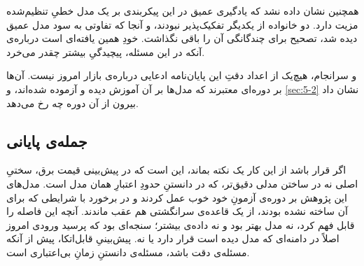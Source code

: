 همچنین نشان داده نشد که یادگیری عمیق در این پیکربندی بر یک مدل خطیِ تنظیم‌شده
مزیت دارد. دو خانواده از یکدیگر تفکیک‌پذیر نبودند، و آنجا که تفاوتی به سود مدل
عمیق دیده شد، تصحیح برای چندگانگی آن را باقی نگذاشت. خودِ همین یافته‌ای است
درباره‌ی آنکه در این مسئله، پیچیدگیِ بیشتر چقدر می‌خرد.

و سرانجام، هیچ‌یک از اعداد دقتِ این پایان‌نامه ادعایی درباره‌ی بازار امروز
نیست. آن‌ها بر دوره‌ای معتبرند که مدل‌ها بر آن آموزش دیده و آزموده شده‌اند، و
\cref{sec:5-2} نشان داد بیرون از آن دوره چه رخ می‌دهد.

\enlargethispage{2\baselineskip}

\subsection*{جمله‌ی پایانی}

{
اگر قرار باشد از این کار یک نکته بماند، این است که در پیش‌بینی قیمت برق،
سختیِ اصلی نه در ساختن مدلی دقیق‌تر، که در دانستنِ حدودِ اعتبارِ همان مدل است.
مدل‌های این پژوهش بر دوره‌ی آزمونِ خود خوب عمل کردند و در برخورد با شرایطی که
برای آن ساخته نشده بودند، از یک قاعده‌ی سرانگشتی هم عقب ماندند. آنچه این فاصله
را قابل فهم کرد، نه مدل بهتر بود و نه داده‌ی بیشتر؛ سنجه‌ای بود که پرسید ورودی
امروز اصلاً در دامنه‌ای که مدل دیده است قرار دارد یا نه. پیش‌بینیِ قابل‌اتکا،
پیش از آنکه مسئله‌ی دقت باشد، مسئله‌ی دانستنِ زمانِ بی‌اعتباری است.\par}
